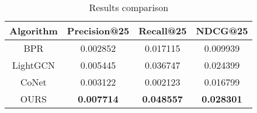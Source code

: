 \begin{table}[ht]
    \centering
    \begin{tabular}{|c|c|c|c|}
        \hline
        \textbf{Algorithm} & \textbf{Precision@25} & \textbf{Recall@25} & \textbf{NDCG@25} \\ \hline
        BPR          & 0.002852 & 0.017115 & 0.009939 \\ \hline
        LightGCN     & 0.005445 & 0.036747 & 0.024399 \\ \hline
        CoNet        & 0.003122 & 0.002123 & 0.016799 \\ \hline
        OURS         & \textbf{0.007714} & \textbf{0.048557} & \textbf{0.028301} \\ \hline
    \end{tabular}
    \caption{Results comparison}
    \label{tab:results}
\end{table}
